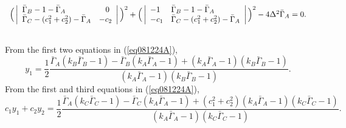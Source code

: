 \documentclass[10pt]{amsart}
\theoremstyle{definition}
\theoremstyle{remark}
\newcommand{\ha}{{\textstyle\frac{1}{2}}}
\begin{document}
\begin{equation}
\label{eqG1071224}
\begin{array}{llll}
\vspace{0.2cm}
\Big(\left|\begin{array}{lllll}
\bar{\Gamma}_B-1-\bar{\Gamma}_A  & \,\,\,\,\,0 \\
\bar{\Gamma}_C-(c_1^2+c_2^2)-\bar{\Gamma}_A & -c_2  \\
  \end{array}\right|\Big)^2+
  \vspace{0.2cm}
\Big(\left|
\begin{array}{lllll}
-1 &\bar{\Gamma}_B-1-\bar{\Gamma}_A\\
-c_1 & \bar{\Gamma}_C-(c_1^2+c_2^2)-\bar{\Gamma}_A \\
\end{array}\right|\Big)^2-
\vspace{0.2cm}
  4\Delta^2\bar{\Gamma}_A=0.
\end{array}
\end{equation}
From the first two equations in (\ref{eq081224A}),
\begin{equation}
\label{eqA151224}
y_1=\frac{1}{2}\frac{\bar{\Gamma}_A(k_B\bar{\Gamma}_B-1)-\bar{\Gamma}_B(k_A\bar{\Gamma}_A-1)+
(k_A\bar{\Gamma}_A-1)(k_B\bar{\Gamma}_B-1)}{(k_A\bar{\Gamma}_A-1)(k_B\bar{\Gamma}_B-1)}.
\end{equation}
From the first and third equations in (\ref{eq081224A}),
\[
\label{eqL081224}
c_1y_1+c_2y_2=\frac{1}{2}\frac{\bar{\Gamma}_A(k_C\bar{\Gamma}_C-1)-\bar{\Gamma}_C(k_A\bar{\Gamma}_A-1)+
(c_1^2+c_2^2)(k_A\bar{\Gamma}_A-1)(k_C\bar{\Gamma}_C-1)}{(k_A\bar{\Gamma}_A-1)(k_C\bar{\Gamma}_C-1)}.
\]
\end{document}
